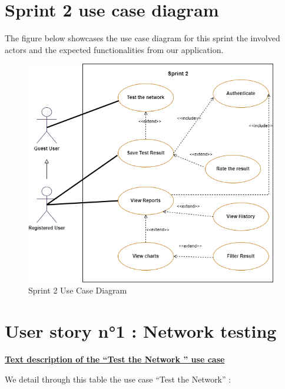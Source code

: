 \newpage

\section{Sprint 2 use case diagram}

The figure below showcases the use case diagram for this sprint the involved actors and the expected functionalities  from our application.

\begin{figure}[H]
    \includegraphics[width=0.98\textwidth]{images/sprint2/Sprint2UC.png}
     \caption{Sprint 2 Use Case Diagram}
    \label{fig:enter-label}
    
\end{figure}

\newpage
\section{User story n°1 : Network testing}
\textbf{\underline{Text description of the “Test the Network ” use case}}

\vspace{0.25cm}
We detail through this table the use case “Test the Network” :

